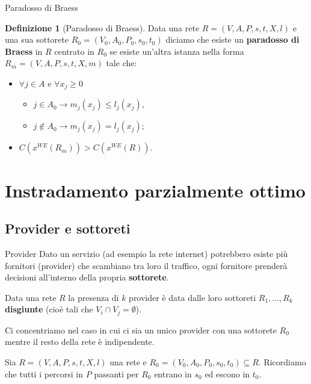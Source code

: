 \documentclass{beamer}
\newcounter{counter1}
\theoremstyle{plain}
\theoremstyle{definition}
\newtheorem{mydef}[counter1]{Definizione}
\theoremstyle{remark}
\newcommand{\pa}[1]{\left(#1\right)}
\begin{document}
\begin{frame}{Paradosso di Braess}
  \begin{mydef}[Paradosso di Braess]
    Data una rete $R=(V,A,P,s,t,X,l)$ e una sua sottorete
    $R_0=(V_0,A_0,P_0,s_0,t_0)$ diciamo che esiste un
    \textbf{paradosso di Braess} in $R$ centrato in $R_0$ se esiste
    un'altra istanza nella forma $R_m=(V,A,P,s,t,X,m)$ tale che:
    \begin{itemize}
    \item $\forall j\in A$ e $\forall x_j \ge0$
      \begin{itemize}
      \item $j \in A_0 \longrightarrow m_j(x_j) \le l_j(x_j)$,
      \item $j \not\in A_0\longrightarrow m_j(x_j) = l_j(x_j)$;
      \end{itemize}
    \item $C\pa{x^{WE}\pa{R_m}} > C\pa{x^{WE}\pa{R}}$.
    \end{itemize}
  \end{mydef}
\end{frame}

\section{Instradamento parzialmente ottimo}

\subsection{Provider e sottoreti}

\begin{frame}{Provider}
  Dato un servizio (ad esempio la rete internet) potrebbero esiste più
  fornitori (provider) che scambiano tra loro il traffico, ogni
  fornitore prenderà decisioni all'interno della propria
  \textbf{sottorete}.

  Data una rete $R$ la presenza di $k$ provider è data dalle loro
  sottoreti $R_1,...,R_k$ \textbf{disgiunte} (cioè tali che $V_i\cap
  V_j = \emptyset$). \vfill

  Ci concentriamo nel caso in cui ci sia un unico provider con una
  sottorete $R_0$ mentre il resto della rete è indipendente.

  Sia $R=(V,A,P,s,t,X,l)$ una rete e $R_0=(V_0,A_0,P_0,s_0,t_0)
  \subseteq R$. Ricordiamo che tutti i percorsi in $P$ passanti per
  $R_0$ entrano in $s_0$ ed escono in $t_0$.
  \vfill
\end{frame}
\end{document}
